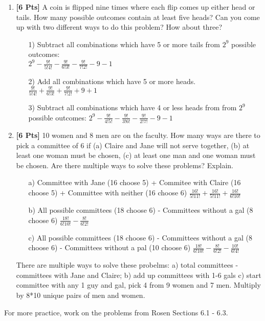 \documentclass[11pt]{article}
\begin{document}
\begin{enumerate}
        \item {\bf [6 Pts]} A coin is flipped nine times where each flip comes up either head or tails. How many possible outcomes contain at least five heads? Can you come up with two different ways to do this problem? How about three?
        \begin{enumerate}
                \item[1)] Subtract all combinations which have 5 or more tails from $2^9$ possible outcomes: \\ $2^9 - \frac{9!}{5!4!} - \frac{9!}{6!3!} - \frac{9!}{7!2!} - 9 - 1$
                \item[2)] Add all combinations which have 5 or more heads. $\frac{9!}{5!4!} + \frac{9!}{6!3!} + \frac{9!}{7!2!} + 9 + 1$
                \item[3)] Subtract all combinations which have 4 or less heads from from $2^9$ possible outcomes: $2^9 - \frac{9!}{4!5!} - \frac{9!}{3!6!} - \frac{9!}{2!7!} - 9 - 1$
        \end{enumerate}
        \item {\bf [6 Pts]} 10 women and 8 men are on the faculty. How many ways are there to pick a committee of 6 if (a) Claire and Jane will not serve together,  (b) at least one woman must be chosen, (c) at least one man and one woman must be chosen. Are there multiple ways to solve these problems? Explain.
        \begin{enumerate}
                \item[a)] Committee with Jane (16 choose 5) + Commitee with Claire (16 choose 5) + Committee with neither (16 choose 6) $\frac{16!}{5!11!} + \frac{16!}{5!11!} + \frac{16!}{6!10!}$
                \item[b)] All possible committees (18 choose 6) - Committees without a gal (8 choose 6) $\frac{18!}{6!10!} - \frac{8!}{6!2!}$
                \item[c)] All possible committees (18 choose 6) - Committees without a gal (8 choose 6) - Committees without a pal (10 choose 6) $\frac{18!}{6!10!} - \frac{8!}{6!2!} - \frac{10!}{6!4!}$
        \end{enumerate}
        There are multiple ways to solve these probelms: a) total committees - committees with Jane and Claire; b) add up committees with 1-6 gals c) start committee with any 1 guy and gal, pick 4 from 9 women and 7 men. Multiply by 8*10 unique pairs of men and women.
    \end{enumerate}


    \noindent
    For more practice, work on the problems from Rosen Sections 6.1 - 6.3.
\end{document}

